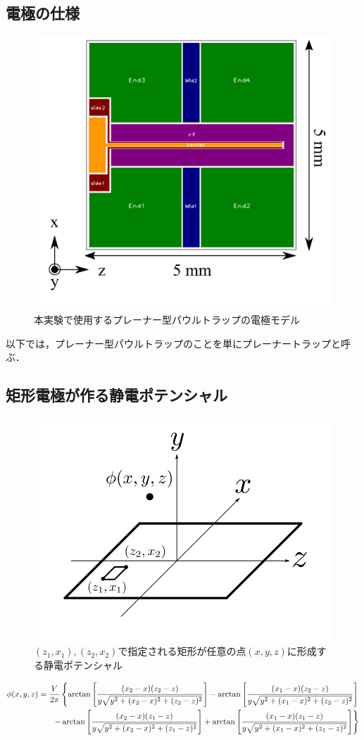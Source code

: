 \subsection{電極の仕様}
\begin{figure}[h]
	\begin{center}
		\includegraphics[width = 0.5\linewidth]{./theory/figure/named_electrode.png}
		\caption{本実験で使用するプレーナー型パウルトラップの電極モデル}
		\label{fig:Named_PlannerTrap}
	\end{center}
\end{figure}
以下では，プレーナー型パウルトラップのことを単にプレーナートラップと呼ぶ．
\subsection{矩形電極が作る静電ポテンシャル}
\begin{figure}[h]
	\begin{center}
		\includegraphics[width = 0.5\linewidth]{./theory/figure/Potential_of_rect-electrode.png}
		\caption{$(z_1,x_1),(z_2,x_2)$で指定される矩形が任意の点$(x,y,z)$に形成する静電ポテンシャル}
		\label{fig:Potential_from_rect-electrode}
	\end{center}
\end{figure}
\begin{align}\label{eq:rectangle_electrode}
	\phi(x,y,z) = \frac{V}{2\pi} \left\lbrace \arctan \left[ \frac{(x_2 - x)(z_2 - z)}{y\sqrt{y^2 + (x_2 - x)^2 + (z_2 - z)^2}}\right] - \arctan \left[ \frac{(x_1 - x)(z_2 - z)}{y\sqrt{y^2 + (x_1 - x)^2 + (z_2 - z)^2}} \right]  \right.  \notag \\ 
	\left. -\arctan \left[ \frac{(x_2 - x)(z_1 - z)}{y\sqrt{y^2 + (x_2 - x)^2 + (z_1 - z)^2}}\right] + \arctan \left[ \frac{(x_1 - x)(z_1 - z)}{y\sqrt{y^2 + (x_1 - x)^2 + (z_1 - z)^2}} \right]  \right\rbrace 
\end{align}
